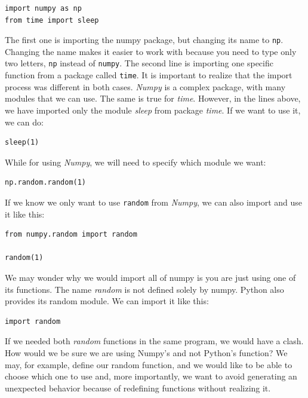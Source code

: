\begin{verbatim}
import numpy as np
from time import sleep
\end{verbatim}

The first one is importing the numpy package, but changing its name to \texttt{np}. Changing the name makes it easier to work with because you need to type only two letters, \texttt{np} instead of \texttt{numpy}. The second line is importing one specific function from a package called \texttt{time}. It is important to realize that the import process was different in both cases. \emph{Numpy} is a complex package, with many modules that we can use. The same is true for \emph{time}. However, in the lines above, we have imported only the module \emph{sleep} from package \emph{time}. If we want to use it, we can do:

\begin{verbatim}
sleep(1)
\end{verbatim}

While for using \emph{Numpy}, we will need to specify which module we want:

\begin{verbatim}
np.random.random(1)
\end{verbatim}

If we know we only want to use \texttt{random} from \emph{Numpy}, we can also import and use it like this:

\begin{verbatim}
from numpy.random import random

random(1)
\end{verbatim}

We may wonder why we would import all of numpy is you are just using one of its functions. The name \emph{random} is not defined solely by numpy. Python also provides its random module. We can import it like this:

\begin{verbatim}
import random
\end{verbatim}

If we needed both \emph{random} functions in the same program, we would have a clash. How would we be sure we are using Numpy's and not Python's function? We may, for example, define our random function, and we would like to be able to choose which one to use and, more importantly, we want to avoid generating an unexpected behavior because of redefining functions without realizing it.

